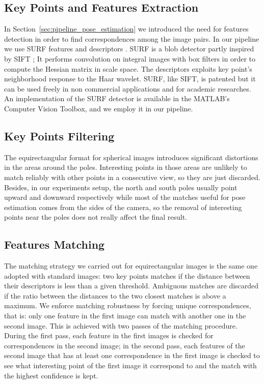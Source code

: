 \subsection{Key Points and Features Extraction}
In Section~\ref{sec:pipeline_pose_estimation} we introduced the need for 
features detection in order to find correspondences among the image pairs.
In our pipeline we use SURF features and descriptors 
\cite{bay2006surf}. SURF is a blob detector partly inspired by SIFT
\cite{lowe1999object};
It performs convolution on integral images with box filters in order to 
compute the Hessian matrix in scale space.
The descriptors exploits key point's neighborhood response to the Haar wavelet.
SURF, like SIFT, is patented but it can be used freely in non commercial
applications and for academic researches.
An implementation of the SURF detector is available in the MATLAB's Computer 
Vision Toolbox, and we employ it in our pipeline.

\subsection{Key Points Filtering}
The equirectangular format for spherical images introduces significant 
distortions in the areas around the poles. Interesting points in those areas 
are unlikely to match reliably with other points in a consecutive view, 
so they are just discarded.
Besides, in our experiments setup, the north and south poles usually point 
upward and downward respectively while most of the matches useful for pose 
estimation comes from the sides of the camera, so the removal of interesting 
points near the poles does not really affect the final result.

\subsection{Features Matching}
The matching strategy we carried out for equirectangular images is the same one 
adopted with standard images: two key points matches if the distance between 
their descriptors is less than a given threshold. Ambiguous matches 
are discarded if the ratio between the distances to the two closest matches is 
above a maximum.
We enforce matching robustness by forcing unique correspondences, that is:
only one feature in the first image can match with another one in the second
image. This is achieved with two passes of the matching procedure. During the 
first pass, each feature in the first images is checked for correspondences in
the second image; in the second pass, each features of the second image that 
has at least one correspondence in the first image is checked to see what 
interesting point of the first image it correspond to and the match with the
highest confidence is kept.

